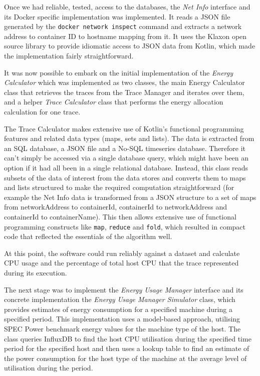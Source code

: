 Once we had reliable, tested, access to the databases, the \emph{Net Info} interface and its Docker specific implementation was implemented.  It reads a JSON file generated by the \texttt{docker network inspect} command and extracts a network address to container ID to hostname mapping from it.  It uses the Klaxon open source library to provide idiomatic access to JSON data from Kotlin, which made the implementation fairly straightforward.

It was now possible to embark on the initial implementation of the \emph{Energy Calculator} which was implemented as two classes, the main Energy Calculator class that retrieves the traces from the Trace Manager and iterates over them, and a helper \emph{Trace Calculator} class that performs the energy allocation calculation for one trace.

The Trace Calculator makes extensive use of Kotlin's functional programming features and related data types (maps, sets and lists).  The data is extracted from an SQL database, a JSON file and a No-SQL timeseries database.  Therefore it can't simply be accessed via a single database query, which might have been an option if it had all been in a single relational database.  Instead, this class reads subsets of the data of interest from the data stores and converts them to maps and lists structured to make the required computation straightforward (for example the Net Info data is transformed from a JSON structure to a set of maps from networkAddress to containerId, containerId to networkAddress and containerId to containerName).  This then allows extensive use of functional programming constructs like \texttt{map}, \texttt{reduce} and \texttt{fold}, which resulted in compact code that reflected the essentials of the algorithm well.

At this point, the software could run reliably against a dataset and calculate CPU usage and the percentage of total host CPU that the trace represented during its execution.

The next stage was to implement the \emph{Energy Usage Manager} interface and its concrete implementation the \emph{Energy Usage Manager Simulator} class, which provides estimates of energy consumption for a specified machine during a specified period.  This implementation uses a model-based approach, utilising SPEC Power benchmark energy values for the machine type of the host.  The class queries InfluxDB to find the host CPU utilisation during the specified time period for the specified host and then uses a lookup table to find an estimate of the power consumption for the host type of the machine at the average level of utilisation during the period.

